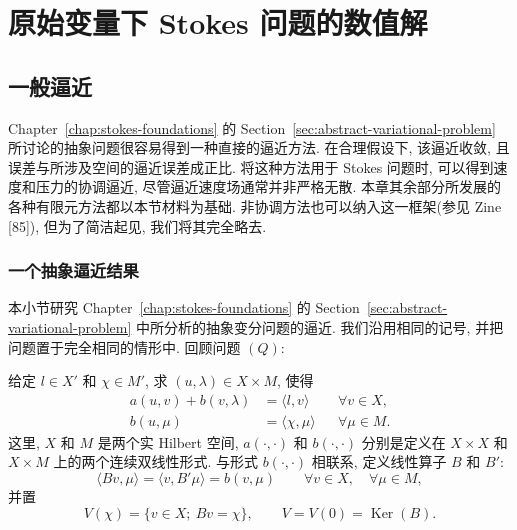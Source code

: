 \makeatletter
\gdef\@chapapp{\chaptername}
\gdef\thechapter{\arabic{chapter}}
\gdef\theHchapter{\arabic{chapter}}
\gdef\Hy@chapapp{chapter}
\makeatother
{}
\setcounter{chapter}{1}
\chapter{原始变量下 Stokes 问题的数值解}\label{chap:stokes-primitive-variables}
\renewcommand{\thesection}{\arabic{section}}
\renewcommand{\thesubsection}{\thesection.\arabic{subsection}}
\renewcommand{\theequation}{\thesection.\arabic{equation}}
\renewcommand{\thestatement}{\thesection.\arabic{statement}}
\renewcommand{\thefigure}{\arabic{figure}}
\setcounter{figure}{6}

\section{一般逼近}\label{sec:primitive-general-approximation}

Chapter~\ref{chap:stokes-foundations} 的 Section~\ref{sec:abstract-variational-problem}
所讨论的抽象问题很容易得到一种直接的逼近方法. 在合理假设下, 该逼近收敛,
且误差与所涉及空间的逼近误差成正比. 将这种方法用于 Stokes 问题时,
可以得到速度和压力的协调逼近, 尽管逼近速度场通常并非严格无散.
本章其余部分所发展的各种有限元方法都以本节材料为基础.
非协调方法也可以纳入这一框架(参见 Zine [85]), 但为了简洁起见,
我们将其完全略去.

\subsection{一个抽象逼近结果}\label{subsec:primitive-abstract-approximation}
\setcounter{equation}{0}

本小节研究 Chapter~\ref{chap:stokes-foundations} 的
Section~\ref{sec:abstract-variational-problem} 中所分析的抽象变分问题的逼近.
我们沿用相同的记号, 并把问题置于完全相同的情形中. 回顾问题 $(Q)$:

给定 $l\in X'$ 和 $\chi\in M'$, 求 $(u,\lambda)\in X\times M$, 使得
\begin{align}
a(u,v)+b(v,\lambda)&=\langle l,v\rangle
&&\forall v\in X,\label{eq:primitive-abstract-q-first}\\
b(u,\mu)&=\langle\chi,\mu\rangle
&&\forall\mu\in M.\label{eq:primitive-abstract-q-second}
\end{align}
这里, $X$ 和 $M$ 是两个实 Hilbert 空间, $a(\cdot,\cdot)$ 和
$b(\cdot,\cdot)$ 分别是定义在 $X\times X$ 和 $X\times M$ 上的两个连续双线性形式.
与形式 $b(\cdot,\cdot)$ 相联系, 定义线性算子 $B$ 和 $B'$:
\[
\langle Bv,\mu\rangle=\langle v,B'\mu\rangle=b(v,\mu)
\qquad\forall v\in X,\quad\forall\mu\in M,
\]
并置
\[
V(\chi)=\{v\in X;\ Bv=\chi\},
\qquad
V=V(0)=\operatorname{Ker}(B).
\]


